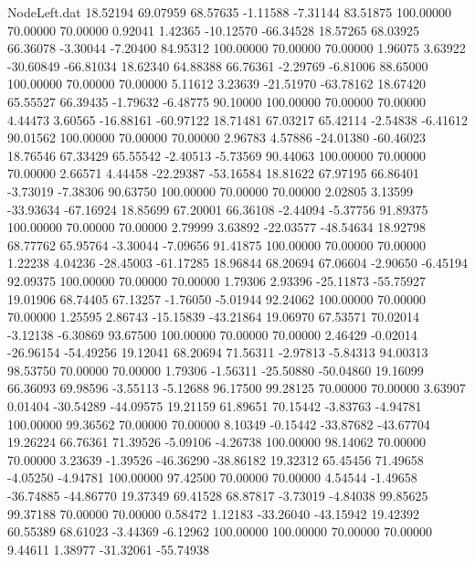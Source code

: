 \begin{filecontents}{NodeLeft.dat}
  18.52194   69.07959   68.57635    -1.11588   -7.31144   83.51875  100.00000   70.00000   70.00000    0.92041    1.42365  -10.12570  -66.34528
  18.57265   68.03925   66.36078    -3.30044   -7.20400   84.95312  100.00000   70.00000   70.00000    1.96075    3.63922  -30.60849  -66.81034
  18.62340   64.88388   66.76361    -2.29769   -6.81006   88.65000  100.00000   70.00000   70.00000    5.11612    3.23639  -21.51970  -63.78162
  18.67420   65.55527   66.39435    -1.79632   -6.48775   90.10000  100.00000   70.00000   70.00000    4.44473    3.60565  -16.88161  -60.97122
  18.71481   67.03217   65.42114    -2.54838   -6.41612   90.01562  100.00000   70.00000   70.00000    2.96783    4.57886  -24.01380  -60.46023
  18.76546   67.33429   65.55542    -2.40513   -5.73569   90.44063  100.00000   70.00000   70.00000    2.66571    4.44458  -22.29387  -53.16584
  18.81622   67.97195   66.86401    -3.73019   -7.38306   90.63750  100.00000   70.00000   70.00000    2.02805    3.13599  -33.93634  -67.16924
  18.85699   67.20001   66.36108    -2.44094   -5.37756   91.89375  100.00000   70.00000   70.00000    2.79999    3.63892  -22.03577  -48.54634
  18.92798   68.77762   65.95764    -3.30044   -7.09656   91.41875  100.00000   70.00000   70.00000    1.22238    4.04236  -28.45003  -61.17285
  18.96844   68.20694   67.06604    -2.90650   -6.45194   92.09375  100.00000   70.00000   70.00000    1.79306    2.93396  -25.11873  -55.75927
  19.01906   68.74405   67.13257    -1.76050   -5.01944   92.24062  100.00000   70.00000   70.00000    1.25595    2.86743  -15.15839  -43.21864
  19.06970   67.53571   70.02014    -3.12138   -6.30869   93.67500  100.00000   70.00000   70.00000    2.46429   -0.02014  -26.96154  -54.49256
  19.12041   68.20694   71.56311    -2.97813   -5.84313   94.00313   98.53750   70.00000   70.00000    1.79306   -1.56311  -25.50880  -50.04860
  19.16099   66.36093   69.98596    -3.55113   -5.12688   96.17500   99.28125   70.00000   70.00000    3.63907    0.01404  -30.54289  -44.09575
  19.21159   61.89651   70.15442    -3.83763   -4.94781  100.00000   99.36562   70.00000   70.00000    8.10349   -0.15442  -33.87682  -43.67704
  19.26224   66.76361   71.39526    -5.09106   -4.26738  100.00000   98.14062   70.00000   70.00000    3.23639   -1.39526  -46.36290  -38.86182
  19.32312   65.45456   71.49658    -4.05250   -4.94781  100.00000   97.42500   70.00000   70.00000    4.54544   -1.49658  -36.74885  -44.86770
  19.37349   69.41528   68.87817    -3.73019   -4.84038   99.85625   99.37188   70.00000   70.00000    0.58472    1.12183  -33.26040  -43.15942
  19.42392   60.55389   68.61023    -3.44369   -6.12962  100.00000  100.00000   70.00000   70.00000    9.44611    1.38977  -31.32061  -55.74938

\end{filecontents}
